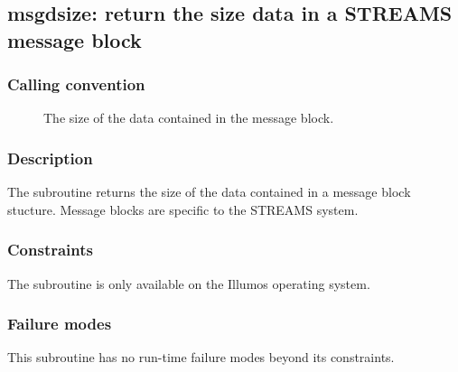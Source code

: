 \clearpage
{}
{}
\label{subr:msgdsize}
\subsection*{msgdsize: return the size data in a STREAMS message block }

\subsubsection*{Calling convention}

\begin{description}
\item[] The size of the data contained in the
  message block.
\end{description}

\subsubsection*{Description}

The  subroutine returns the size of the data
contained in a message block stucture.  Message blocks are specific to
the STREAMS system.

\subsubsection*{Constraints}

The  subroutine is only available on the Illumos
operating system.

\subsubsection*{Failure modes}

This subroutine has no run-time failure modes beyond its constraints.
